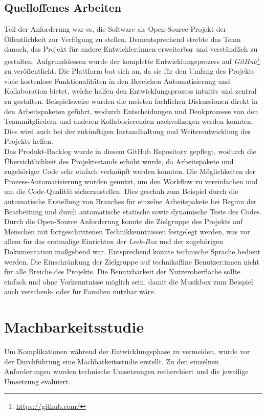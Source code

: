\documentclass[10pt, a4paper]{article}
\begin{document}
\begin{onehalfspace}
  \subsection{Quelloffenes Arbeiten}
  Teil der Anforderung war es, die Software als Open-Source-Projekt der Öffentlichkeit zur Verfügung zu stellen.
  Dementsprechend strebte das Team danach, das Projekt für andere Entwickler:innen erweiterbar und verständlich zu gestalten.
  Aufgrunddessen wurde der komplette Entwicklungsprozess auf \textit{GitHub}\footnote{\url{https://github.com/}} zu veröffentlicht.
  Die Plattform bot sich an, da sie für den Umfang des Projekts viele kostenlose Funktionalitäten in den Bereichen Automatisierung und Kollaboration bietet, welche halfen den Entwicklungsprozess intuitiv und zentral zu gestalten.
  Beispielsweise wurden die meisten fachlichen Diskussionen direkt in den Arbeitspaketen geführt, wodurch Entscheidungen und Denkprozesse von den Teammitgliedern und anderen Kollaborierenden nachvollzogen werden konnten.
  Dies wird auch bei der zukünftigen Instandhaltung und Weiterentwicklung des Projekts helfen.
  \\
  Das Produkt-Backlog wurde in diesem GitHub Repository gepflegt,
   wodurch die Übersichtlichkeit des Projektsstands erhöht wurde, da Arbeitspakete und zugehöriger Code sehr einfach verknüpft werden konnten.
  Die Möglichkeiten der Prozess-Automatisierung wurden genutzt, um den Workflow zu vereinfachen und um die Code-Qualität sicherzustellen.
  Dies geschah zum Beispiel durch die automatische Erstellung von Branches für einzelne Arbeitspakete bei Beginn der Bearbeitung und durch automatische statische sowie dynamische Tests des Codes.
  \\
  Durch die Open-Source Anforderung konnte die Zielgruppe des Projekts auf Menschen mit fortgeschrittenen Technikkenntnissen festgelegt werden,
   was vor allem für das erstmalige Einrichten der \textit{Leek-Box} und der zugehörigen Dokumentation maßgebend war.
  Entsprechend konnte technische Sprache bedient werden.
  Die Einschränkung der Zielgruppe auf technikaffine Benutzer:innen nicht für alle Breiche des Projekts.
  Die Benutzbarkeit der Nutzeroberfläche sollte einfach und ohne Vorkenntnisse möglich sein, damit die Musikbox zum Beispiel auch verschenk- oder für Familien nutzbar wäre.

\section{Machbarkeitsstudie}
\label{machbarkeitsstudie}
Um Komplikationen während der Entwicklungsphase zu vermeiden, wurde vor der Durchführung eine Machbarkeitsstudie erstellt.
Zu den einzelnen Anforderungen wurden technische Umsetzungen recherchiert und die jeweilige Umsetzung evaluiert.


\end{onehalfspace}
\end{document}
